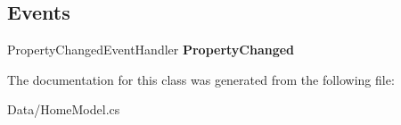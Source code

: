 \subsection*{Events}
\begin{DoxyCompactItemize}
\item 
\mbox{\label{class_a_f_h___scheduler_1_1_data_1_1_home_model_a63c34223a3e991f9ff06c6be107220fb}} 
Property\+Changed\+Event\+Handler {\bfseries Property\+Changed}
\end{DoxyCompactItemize}


The documentation for this class was generated from the following file\+:\begin{DoxyCompactItemize}
\item 
Data/Home\+Model.\+cs\end{DoxyCompactItemize}
